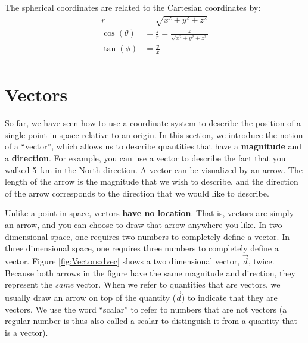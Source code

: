 
 The spherical coordinates are related to the Cartesian coordinates by:
\begin{align*}
r &= \sqrt{x^2+y^2+z^2}\\
\cos(\theta) &= \frac{z}{r}=\frac{z}{\sqrt{x^2+y^2+z^2}}\\
\tan(\phi) &= \frac{y}{x}\\
\end{align*}

\section{Vectors}
So far, we have seen how to use a coordinate system to describe the position of a single point in space relative to an origin. In this section, we introduce the notion of a ``vector'', which allows us to describe quantities that have a \textbf{magnitude} and a \textbf{direction}. For example, you can use a vector to describe the fact that you walked \SI{5}{km} in the North direction. A vector can be visualized by an arrow. The length of the arrow is the magnitude that we wish to describe, and the direction of the arrow corresponds to the direction that we would like to describe. 

Unlike a point in space, vectors \textbf{have no location}. That is, vectors are simply an arrow, and you can choose to draw that arrow anywhere you like. In two dimensional space, one requires two numbers to completely define a vector. In three dimensional space, one requires three numbers to completely define a vector. Figure \ref{fig:Vectors:dvec} shows a two dimensional vector, $\vec d$, twice. Because both arrows in the figure have the same magnitude and direction, they represent the \textit{same} vector. When we refer to quantities that are vectors, we usually draw an arrow on top of the quantity ($\vec d$) to indicate that they are vectors. We use the word ``scalar'' to refer to numbers that are not vectors (a regular number is thus also called a scalar to distinguish it from a quantity that is a vector).


